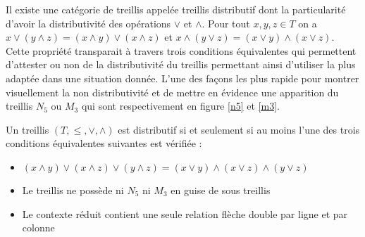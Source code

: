 Il existe une catégorie de treillis appelée treillis distributif dont la particularité d'avoir la distributivité des opérations $\vee$ et $\wedge$. Pour tout $x, y, z \in T$ on a $x \vee (y \wedge z) = (x \wedge y) \vee (x \wedge z)$ et $x \wedge (y \vee z) = (x\vee y) \wedge (x \vee z)$. Cette propriété transparait à travers trois conditions équivalentes qui permettent d'attester ou non de la distributivité du treillis permettant ainsi d'utiliser la plus adaptée dans une situation donnée. L'une des façons les plus rapide pour montrer visuellement la non distributivité et de mettre en évidence une apparition du treillis $N_5$ ou $M_3$ qui sont respectivement en figure \ref{n5} et \ref{m3}.

\begin{definition}
Un treillis $(T, \leq, \vee, \wedge)$ est distributif si et seulement si au moins l'une des trois conditions équivalentes suivantes est vérifiée :
\begin{itemize}
	\item $(x \wedge y) \vee (x \wedge z) \vee (y \wedge z) = (x \vee y) \wedge (x \vee z) \wedge (y \vee z)$
	\item Le treillis ne possède ni $N_5$ ni $M_3$ en guise de sous treillis
	\item Le contexte réduit contient une seule relation flèche double par ligne et par colonne
\end{itemize}
\end{definition}

